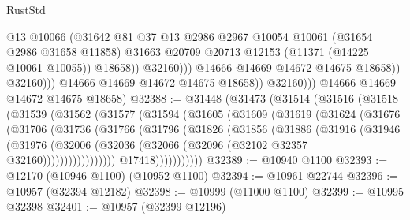 \begin{lexlean}{RustStd}
\begin{coremodule}
                                  @13
                                  @10066
                                  (@31642
                                    @81
                                    @37
                                    @13
                                    @2986
                                    @2967
                                    @10054
                                    @10061
                                    (@31654 @2986 @31658 @11858)
                                    @31663
                                    @20709
                                    @20713
                                    @12153
                                    (@11371 (@14225 @10061 @10055))
                                    @18658))
                                @32160)))
                          @14666
                          @14669
                          @14672
                          @14675
                          @18658))
                      @32160)))
                @14666
                @14669
                @14672
                @14675
                @18658))
            @32160)))
      @14666
      @14669
      @14672
      @14675
      @18658)
@32388 := @31448
    (@31473
      (@31514
        (@31516
          (@31518
            (@31539
              (@31562
                (@31577
                  (@31594
                    (@31605
                      (@31609
                        (@31619
                          (@31624
                            (@31676
                              (@31706
                                (@31736
                                  (@31766
                                    (@31796
                                      (@31826
                                        (@31856
                                          (@31886
                                            (@31916
                                              (@31946
                                                (@31976
                                                  (@32006
                                                    (@32036
                                                      (@32066
                                                        (@32096
                                                          (@32102 @32357 @32160)))))))))))))))))
                          @17418)))))))))))
@32389 := @10940 @1100
@32393 := @12170 (@10946 @1100) (@10952 @1100)
@32394 := @10961 @22744
@32396 := @10957 (@32394 @12182)
@32398 := @10999 (@11000 @1100)
@32399 := @10995 @32398
@32401 := @10957 (@32399 @12196)

\end{coremodule}
\end{lexlean}

